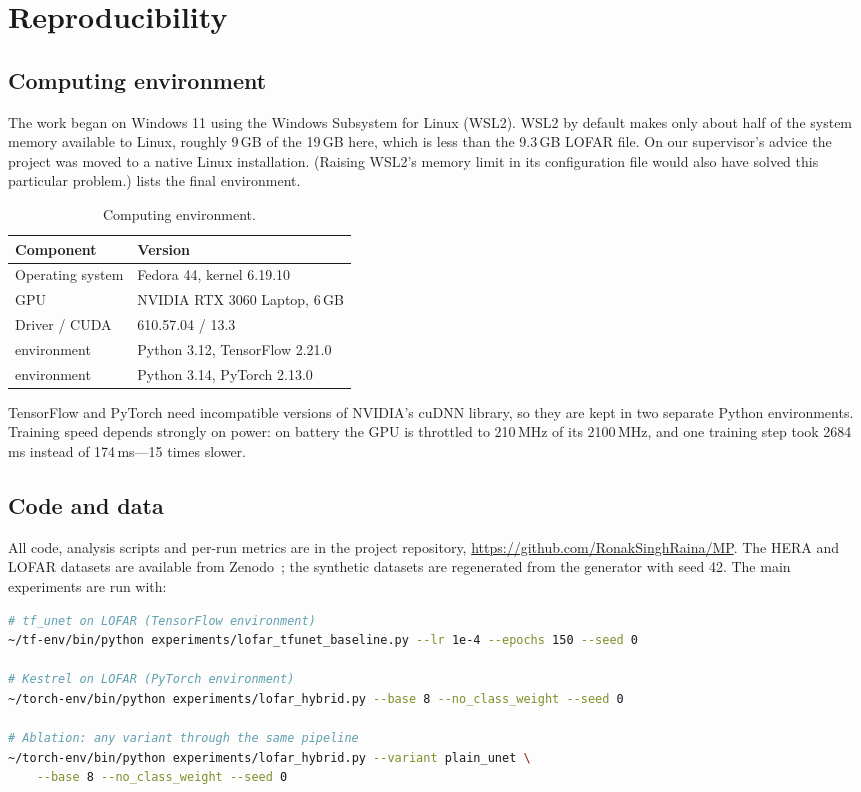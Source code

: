 \chapter{Reproducibility}
\label{app:repro}

\section{Computing environment}
The work began on Windows 11 using the Windows Subsystem for Linux (WSL2). WSL2
by default makes only about half of the system memory available to Linux,
roughly 9\,GB of the 19\,GB here, which is less than the 9.3\,GB LOFAR file. On
our supervisor's advice the project was moved to a native Linux installation.
(Raising WSL2's memory limit in its configuration file would also have solved
this particular problem.)  lists the final environment.

\begin{table}[H]
  \centering
  \caption{Computing environment.}
  \label{tab:env}
  \begin{tabular}{ll}
    \toprule
    Component & Version \\
    \midrule
    Operating system & Fedora 44, kernel 6.19.10 \\
    GPU & NVIDIA RTX 3060 Laptop, 6\,GB \\
    Driver / CUDA & 610.57.04 / 13.3 \\
    \tfunet{} environment & Python 3.12, TensorFlow 2.21.0 \\
    \hybrid{} environment & Python 3.14, PyTorch 2.13.0 \\
    \bottomrule
  \end{tabular}
\end{table}

TensorFlow and PyTorch need incompatible versions of NVIDIA's cuDNN library, so
they are kept in two separate Python environments. Training speed depends
strongly on power: on battery the GPU is throttled to 210\,MHz of its 2100\,MHz,
and one \tfunet{} training step took 2684\,ms instead of 174\,ms---15 times
slower.

\section{Code and data}
All code, analysis scripts and per-run metrics are in the project repository,
\url{https://github.com/RonakSinghRaina/MP}. The HERA and LOFAR datasets are
available from Zenodo~\cite{mesarcik2022data}; the synthetic datasets are
regenerated from the generator with seed 42. The main experiments are run with:
\begin{lstlisting}[language=bash]
# tf_unet on LOFAR (TensorFlow environment)
~/tf-env/bin/python experiments/lofar_tfunet_baseline.py --lr 1e-4 --epochs 150 --seed 0

# Kestrel on LOFAR (PyTorch environment)
~/torch-env/bin/python experiments/lofar_hybrid.py --base 8 --no_class_weight --seed 0

# Ablation: any variant through the same pipeline
~/torch-env/bin/python experiments/lofar_hybrid.py --variant plain_unet \
    --base 8 --no_class_weight --seed 0
\end{lstlisting}
